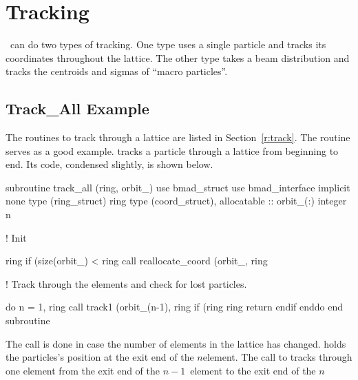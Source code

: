 \chapter{Tracking}
\label{s:tm}

\bmad\ can do two types of tracking. One type uses a single particle 
and tracks its coordinates throughout the lattice. The other type
takes a beam distribution and tracks the centroids and sigmas of
``macro particles''.  

\section{Track\_All Example}

The routines to track through a lattice are listed in
Section~\ref{r:track}. The  routine serves as a good
example.  tracks a particle through a lattice from
beginning to end. Its code, condensed slightly, is shown below.
\begin{example}
  subroutine track_all (ring, orbit_)
    use bmad_struct
    use bmad_interface
    implicit none
    type (ring_struct)  ring
    type (coord_struct), allocatable :: orbit_(:)
    integer n

  ! Init

    ring%
    if (size(orbit_) < ring%
                    call reallocate_coord (orbit_, ring%

  ! Track through the elements and check for lost particles.

    do n = 1, ring%
      call track1 (orbit_(n-1), ring%
      if (ring%
        ring%
        return
      endif
    enddo
  end subroutine
\end{example}
The  call is done in case the number of elements
in the lattice has changed.  holds the particles's
position at the exit end of the $n$\Th element. The call to
 tracks through one element from the exit end of the
$n-1$\St\ element to the exit end of the $n$\Th
